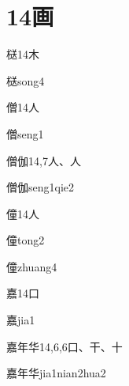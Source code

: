 
\section*{14画}

\begin{entry}{㮸}{14}{⽊}
  \begin{phonetics}{㮸}{song4}
  \end{phonetics}
\end{entry}

\begin{entry}{僧}{14}{⼈}
  \begin{phonetics}{僧}{seng1}
  \end{phonetics}
\end{entry}

\begin{entry}{僧伽}{14,7}{⼈、⼈}
  \begin{phonetics}{僧伽}{seng1qie2}
  \end{phonetics}
\end{entry}

\begin{entry}{僮}{14}{⼈}
  \begin{phonetics}{僮}{tong2}
  \end{phonetics}
  \begin{phonetics}{僮}{zhuang4}
  \end{phonetics}
\end{entry}

\begin{entry}{嘉}{14}{⼝}
  \begin{phonetics}{嘉}{jia1}
  \end{phonetics}
\end{entry}

\begin{entry}{嘉年华}{14,6,6}{⼝、⼲、⼗}
  \begin{phonetics}{嘉年华}{jia1nian2hua2}
  \end{phonetics}
\end{entry}

